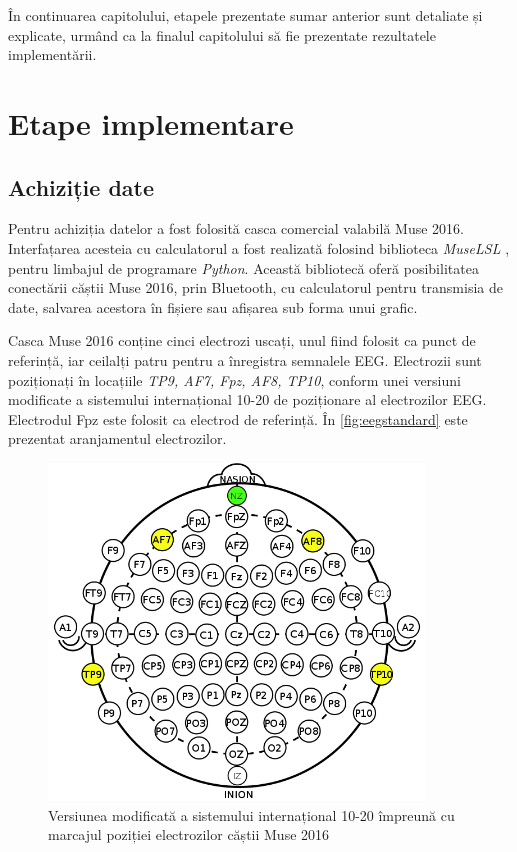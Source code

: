 În continuarea capitolului, etapele prezentate sumar anterior sunt detaliate și explicate, urmând ca la finalul capitolului să fie prezentate rezultatele implementării.

\section{Etape implementare}

\subsection{Achiziție date}\label{subsec:achizitie-date}
Pentru achiziția datelor a fost folosită casca comercial valabilă Muse 2016. Interfațarea acesteia cu calculatorul a fost realizată folosind biblioteca \textit{MuseLSL} \cite{online:muselsl}, pentru limbajul de programare \textit{Python}. Această bibliotecă oferă posibilitatea conectării căștii Muse 2016, prin Bluetooth, cu calculatorul pentru transmisia de date, salvarea acestora în fișiere sau afișarea sub forma unui grafic.

Casca Muse 2016 conține cinci electrozi uscați, unul fiind folosit ca punct de referință, iar ceilalți patru pentru a înregistra semnalele EEG. Electrozii sunt poziționați în locațiile \textit{TP9, AF7, Fpz, AF8, TP10}, conform unei versiuni modificate a sistemului internațional 10-20 de poziționare al electrozilor EEG. Electrodul Fpz este folosit ca electrod de referință. În \autoref{fig:eegstandard} este prezentat aranjamentul electrozilor.

\begin{figure}[ht]
\centering
\includegraphics[width=10cm, keepaspectratio]{fig/cap3/EEGstandard.png}
\caption{Versiunea modificată a sistemului internațional 10-20 împreună cu marcajul poziției electrozilor căștii Muse 2016 \cite{eeg:2018}}
\label{fig:eegstandard}
\end{figure}

